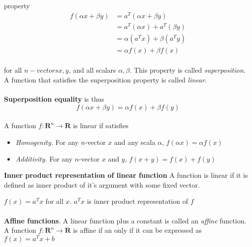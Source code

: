 \documentclass[a4paper, 12pt]{article}
\begin{document}
property
\begin{align*}
f(\alpha x +\beta y) &= a^T(\alpha x + \beta y) \\
&= a^T(\alpha x) + a^T(\beta y) \\
&= \alpha(a^Tx) + \beta(a^Ty) \\
&= \alpha f(x) + \beta f(x)
\end{align*}
\\
for all $n-vectors x, y$, and all scalars $\alpha, \beta$. This property is called \textit{superposition}.
 A function that satisfies the superposition property is called \textit{linear}.
\\
\\
\textbf{Superposition equality} is thus
\begin{equation}
f(\alpha x + \beta y) = \alpha f(x) + \beta f(y)
\end{equation}
\\
A function  $ f: \mathbf{R}^n \to \mathbf{R} $ is linear if satisfies
\begin{itemize}
\item \textit{Homogenity.} For any $n$-vector $x$ and any scala $\alpha$, $f(\alpha x) = \alpha f(x)$
\item \textit{Additivity.} For any $n$-vector $x$ and $y$, $f(x + y) = f(x) + f(y)$
\end{itemize}

\textbf{Inner product representation of linear function}
A function is linear if it is defined as inner product of it's argument with some fixed vector.

$f(x) = a^Tx$ for all $x$.
$a^Tx$ is inner product representation of $f$
\\
\\
\textbf{Affine functions}. A linear function plus a constant is called an \textit{affine} function.
A function $f: \mathbf{R} ^n \to \mathbf{R}$ is affine if an only if it can be expressed as $f(x) = a^T x + b$
\end{document}
